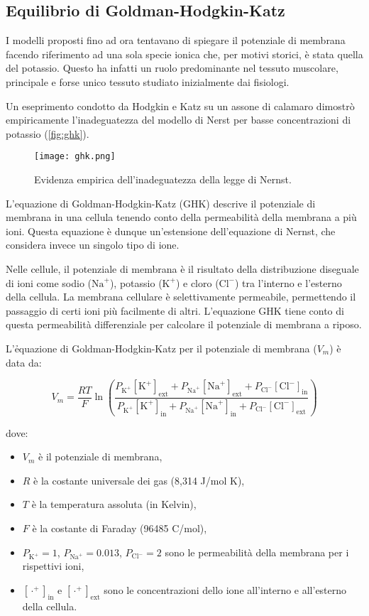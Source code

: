 \subsection{Equilibrio di Goldman-Hodgkin-Katz}
I modelli proposti fino ad ora tentavano di spiegare il potenziale di membrana facendo riferimento ad una sola specie ionica che, per motivi storici, è stata quella del potassio. Questo ha infatti un ruolo predominante nel tessuto muscolare, principale e forse unico tessuto studiato inizialmente dai fisiologi.

Un eseprimento condotto da Hodgkin e Katz su un assone di calamaro dimostrò empiricamente l'inadeguatezza del modello di Nerst per basse concentrazioni di potassio (\autoref{fig:ghk}).

\begin{figure}[h]
    \centering
    \texttt{[image: ghk.png]}
    \caption{Evidenza empirica dell'inadeguatezza della legge di Nernst.}
    \label{fig:ghk}
\end{figure}

L'equazione di Goldman-Hodgkin-Katz (GHK) descrive il potenziale di membrana in una cellula tenendo conto della permeabilità della membrana a più ioni. Questa equazione è dunque un'estensione dell'equazione di Nernst, che considera invece un singolo tipo di ione.

Nelle cellule, il potenziale di membrana è il risultato della distribuzione diseguale di ioni come sodio (\( \text{Na}^+ \)), potassio (\( \text{K}^+ \)) e cloro (\( \text{Cl}^- \)) tra l'interno e l'esterno della cellula. La membrana cellulare è selettivamente permeabile, permettendo il passaggio di certi ioni più facilmente di altri. L'equazione GHK tiene conto di questa permeabilità differenziale per calcolare il potenziale di membrana a riposo.

L'\h{equazione di Goldman-Hodgkin-Katz} per il potenziale di membrana (\( V_m \)) è data da:

\[
\boxed{
V_m = \frac{RT}{F} \ln \left( \frac{P_{\text{K}^+}[\text{K}^+]_\text{ext} + P_{\text{Na}^+}[\text{Na}^+]_\text{{ext}} + P_{\text{Cl}^-}[\text{Cl}^-]_\text{in}}{P_{\text{K}^+}[\text{K}^+]_\text{in} + P_{\text{Na}^+}[\text{Na}^+]_\text{in} + P_{\text{Cl}^-}[\text{Cl}^-]_\text{ext}} \right)
}
\]

dove:
\begin{itemize}
    \item \( V_m \) è il potenziale di membrana,
    \item \( R \) è la costante universale dei gas (8,314 J/mol K),
    \item \( T \) è la temperatura assoluta (in Kelvin),
    \item \( F \) è la costante di Faraday (96485 C/mol),
    \item \( P_{\text{K}^+} = 1 \), \( P_{\text{Na}^+} = 0.013 \), \( P_{\text{Cl}^-} = 2\) sono le permeabilità della membrana per i rispettivi ioni,
    \item \( [\cdot^+]_\text{in} \) e \( [\cdot^+]_\text{{ext}} \) sono le concentrazioni dello ione all'interno e all'esterno della cellula.
\end{itemize}


